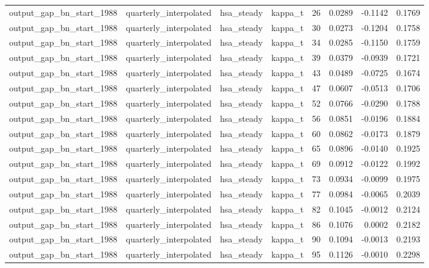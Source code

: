 \begin{tabular}{llllrrrr}
output\_gap\_bn\_start\_1988 & quarterly\_interpolated & hsa\_steady & kappa\_t & 26 & 0.0289 & -0.1142 & 0.1769 \\
output\_gap\_bn\_start\_1988 & quarterly\_interpolated & hsa\_steady & kappa\_t & 30 & 0.0273 & -0.1204 & 0.1758 \\
output\_gap\_bn\_start\_1988 & quarterly\_interpolated & hsa\_steady & kappa\_t & 34 & 0.0285 & -0.1150 & 0.1759 \\
output\_gap\_bn\_start\_1988 & quarterly\_interpolated & hsa\_steady & kappa\_t & 39 & 0.0379 & -0.0939 & 0.1721 \\
output\_gap\_bn\_start\_1988 & quarterly\_interpolated & hsa\_steady & kappa\_t & 43 & 0.0489 & -0.0725 & 0.1674 \\
output\_gap\_bn\_start\_1988 & quarterly\_interpolated & hsa\_steady & kappa\_t & 47 & 0.0607 & -0.0513 & 0.1706 \\
output\_gap\_bn\_start\_1988 & quarterly\_interpolated & hsa\_steady & kappa\_t & 52 & 0.0766 & -0.0290 & 0.1788 \\
output\_gap\_bn\_start\_1988 & quarterly\_interpolated & hsa\_steady & kappa\_t & 56 & 0.0851 & -0.0196 & 0.1884 \\
output\_gap\_bn\_start\_1988 & quarterly\_interpolated & hsa\_steady & kappa\_t & 60 & 0.0862 & -0.0173 & 0.1879 \\
output\_gap\_bn\_start\_1988 & quarterly\_interpolated & hsa\_steady & kappa\_t & 65 & 0.0896 & -0.0140 & 0.1925 \\
output\_gap\_bn\_start\_1988 & quarterly\_interpolated & hsa\_steady & kappa\_t & 69 & 0.0912 & -0.0122 & 0.1992 \\
output\_gap\_bn\_start\_1988 & quarterly\_interpolated & hsa\_steady & kappa\_t & 73 & 0.0934 & -0.0099 & 0.1975 \\
output\_gap\_bn\_start\_1988 & quarterly\_interpolated & hsa\_steady & kappa\_t & 77 & 0.0984 & -0.0065 & 0.2039 \\
output\_gap\_bn\_start\_1988 & quarterly\_interpolated & hsa\_steady & kappa\_t & 82 & 0.1045 & -0.0012 & 0.2124 \\
output\_gap\_bn\_start\_1988 & quarterly\_interpolated & hsa\_steady & kappa\_t & 86 & 0.1076 & 0.0002 & 0.2182 \\
output\_gap\_bn\_start\_1988 & quarterly\_interpolated & hsa\_steady & kappa\_t & 90 & 0.1094 & -0.0013 & 0.2193 \\
output\_gap\_bn\_start\_1988 & quarterly\_interpolated & hsa\_steady & kappa\_t & 95 & 0.1126 & -0.0010 & 0.2298 \\

\end{tabular}
